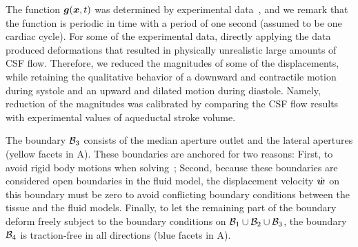 \documentclass{template}
\begin{document}
The function $\bm{g}(\bm{x}, t)$ was determined by experimental
data~\cite{Kurtcuoglu2007ComputationalSylvius,
Enzmann1992BrainImaging, soellinger20093d, soellinger2007assessment,
greitz1992pulsatile, almudayni2023magnetic, pahlavian2018regional},
and we remark that the function is periodic in time with a period of
one second (assumed to be one cardiac cycle).
For some of the experimental data, directly applying the data produced
deformations that resulted in physically unrealistic large amounts of CSF flow.
Therefore, we reduced the magnitudes of some of the displacements,
while retaining the qualitative behavior
of a downward and contractile motion during systole and an upward
and dilated motion during diastole. Namely, reduction of the magnitudes was 
calibrated by comparing the CSF flow results with experimental values
of aqueductal stroke volume\cite{eide2021direction, wagshul2011pulsating}. 

The boundary $\mathcal{B}_3$ consists of the median aperture outlet
and the lateral apertures (yellow facets in A).
These boundaries are anchored for two reasons:
First, to avoid rigid body motions when solving~;
Second, because these boundaries are
considered open boundaries in the fluid model, the displacement velocity
$\dot{\bm{w}}$ on this boundary must be zero to avoid conflicting boundary conditions
between the tissue and the fluid models.
Finally, to let the remaining part of the boundary deform freely subject to the boundary conditions
on $\mathcal{B}_1\cup\mathcal{B}_2\cup\mathcal{B}_3$, the boundary $\mathcal{B}_4$ is traction-free in all directions
(blue facets in A).
\end{document}
